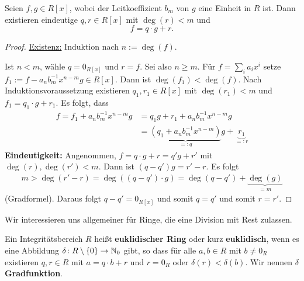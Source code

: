 \begin{satz}\label{satz5_10}
	Seien $f,g \in R[x]$, wobei der Leitkoeffizient $b_m$ von $g$ eine Einheit in $R$ ist. Dann existieren eindeutige $q,r \in R[x]$ mit $\deg(r) < m$ und
	\[f = q \cdot g + r.\]
\end{satz}
\begin{proof}
	\underline{Existenz:} Induktion nach $n := \deg(f)$.
	
	Ist $n < m$, wähle $q = 0_{R[x]}$ und $r=f$. Sei also $n \geq m$. Für $f = \sum_i a_i x^i$ setze $f_1 := f - a_n b_m^{-1} x^{n-m} g \in R[x]$. Dann ist $\deg(f_1) < \deg(f)$. Nach Induktionsvoraussetzung existieren $q_1, r_1 \in R[x]$ mit $\deg(r_1) < m$ und $f_1 = q_1 \cdot g + r_1$. Es folgt, dass 
	\begin{align*}
	f = f_1 + a_n b_m^{-1} x^{n-m} g &= q_1 g + r_1 + a_n b_m^{-1} x^{n-m} g\\
	&= 	\underbrace{(q_1 + a_n b_m^{-1} x^{n-m})}_{=: q} g + \underbrace{r_1}_{=:r}
	\end{align*}
	\textbf{Eindeutigkeit: } Angenommen, $f = q\cdot g + r = q' g + r'$ mit $\deg(r), \deg(r') < m$. Dann ist $(q- q')g = r' - r$. Es folgt 
	\begin{align*}
		m > \deg(r'-r) = \deg((q - q')\cdot g) = \deg(q-q') + \underbrace{\deg(g)}_{=m}
	\end{align*}
	(Gradformel). Daraus folgt $q-q' = 0_{R[x]}$ und somit $q = q'$ und somit $r=r'$.
\end{proof}
Wir interessieren uns allgemeiner für Ringe, die eine Division mit Rest zulassen.
\begin{definition}
	Ein Integritätsbereich $R$ heißt \textbf{euklidischer Ring} oder kurz \textbf{euklidisch}, wenn es eine Abbildung $\delta \colon R \setminus \{0\} \to \mathbb{N}_0$ gibt, so dass für alle $a,b \in R$ mit $b\neq 0_R$ existieren $q,r \in R$ mit $a = q\cdot b + r$ und $r= 0_R$ oder $\delta(r) < \delta(b)$. Wir nennen $\delta$ \textbf{Gradfunktion}.
\end{definition}
